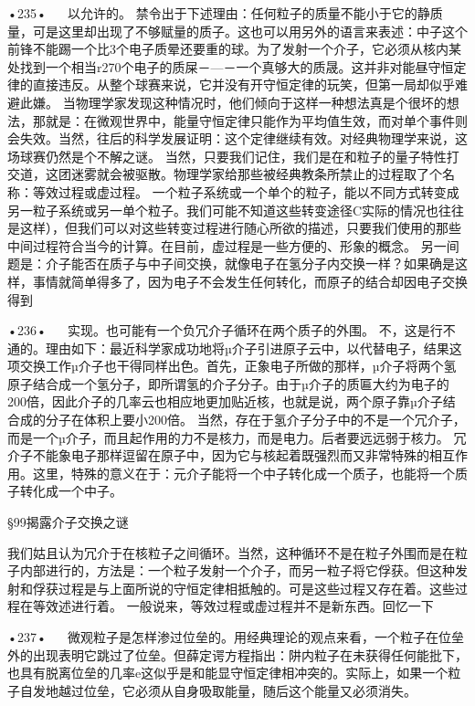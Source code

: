 •235•
  
以允许的。
禁令出于下述理由：任何粒子的质量不能小于它的静质量，可是这里却出现了不够赋量的质子。这也可以用另外的语言来表述：中子这个前锋不能踢一个比3个电子质晕还要重的球。为了发射一个介子，它必须从核内某处找到一个相当r270个电子的质屎－—－一个真够大的质晟。这并非对能昼守恒定律的直接违反。从整个球赛来说，它并没有开守恒定律的玩笑，但第一局却似乎难避此嫌。
当物理学家发现这种情况时，他们倾向于这样一种想法真是个很坏的想法，那就是：在微观世界中，能量守恒定律只能作为平均值生效，而对单个事件则会失效。当然，往后的科学发展证明：这个定律继续有效。对经典物理学来说，这场球赛仍然是个不解之谜。
当然，只要我们记住，我们是在和粒子的量子特性打交道，这团迷雾就会被驱散。物理学家给那些被经典教条所禁止的过程取了个名称：等效过程或虚过程。
一个粒子系统或一个单个的粒子，能以不同方式转变成另一粒子系统或另一单个粒子。我们可能不知道这些转变途径C实际的情况也往往是这样），但我们可以对这些转变过程进行随心所欲的描述，只要我们使用的那些中间过程符合当今的计算。在目前，虚过程是一些方便的、形象的概念。
另一间题是：介子能否在质子与中子间交换，就像电子在氢分子内交换一样？如果确是这样，事情就简单得多了，因为电子不会发生任何转化，而原子的结合却因电子交换得到

•236•
  
实现。也可能有一个负冗介子循环在两个质子的外围。
不，这是行不通的。理由如下：最近科学家成功地将µ介子引进原子云中，以代替电子，结果这项交换工作µ介子也干得同样出色。首先，正象电子所做的那样，µ介子将两个氢原子结合成一个氢分子，即所谓氢的介子分子。由于µ介子的质匾大约为电子的200倍，因此介子的几率云也相应地更加贴近核，也就是说，两个原子靠µ介子结合成的分子在体积上要小200倍。
当然，存在于氢介子分子中的不是一个冗介子，而是一个µ介子，而且起作用的力不是核力，而是电力。后者要远远弱于核力。
冗介子不能象电子那样逗留在原子中，因为它与核起着既强烈而又非常特殊的相互作用。这里，特殊的意义在于：元介子能将一个中子转化成一个质子，也能将一个质子转化成一个中子。

§99揭露介子交换之谜

我们姑且认为冗介于在核粒子之间循环。当然，这种循环不是在粒子外围而是在粒子内部进行的，方法是：一个粒子发射一个介子，而另一粒子将它俘获。但这种发射和俘获过程是与上面所说的守恒定律相抵触的。可是这些过程又存在着。这些过程在等效述进行着。
一般说来，等效过程或虚过程并不是新东西。回忆一下

•237•
  
微观粒子是怎样渗过位垒的。用经典理论的观点来看，一个粒子在位垒外的出现表明它跳过了位垒。但薛定谔方程指出：阱内粒子在未获得任何能批下，也具有脱离位垒的几率e这似乎是和能显守恒定律相冲突的。实际上，如果一个粒子自发地越过位垒，它必须从自身吸取能量，随后这个能量又必须消失。

